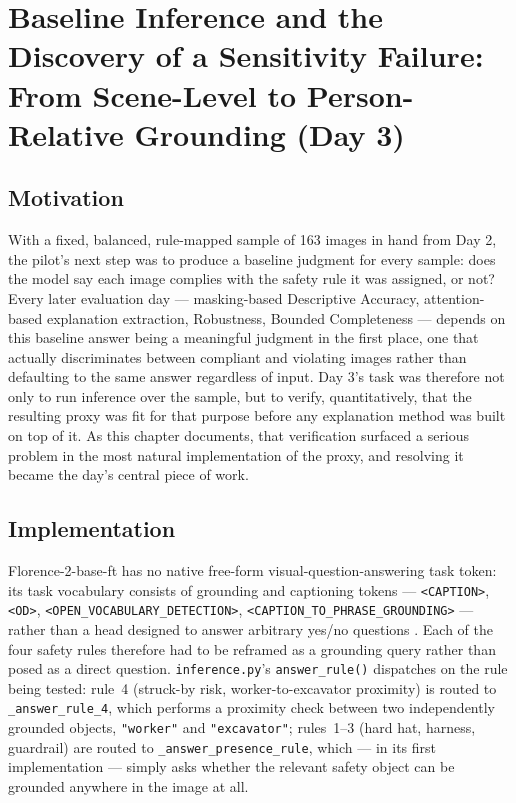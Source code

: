 \chapter{Baseline Inference and the Discovery of a Sensitivity Failure: From Scene-Level to Person-Relative Grounding (Day 3)}
\label{chap:day03}

\section{Motivation}

With a fixed, balanced, rule-mapped sample of 163 images in hand from Day 2, the pilot's next
step was to produce a baseline judgment for every sample: does the model say each image complies
with the safety rule it was assigned, or not? Every later evaluation day --- masking-based
Descriptive Accuracy, attention-based explanation extraction, Robustness, Bounded Completeness ---
depends on this baseline answer being a meaningful judgment in the first place, one that actually
discriminates between compliant and violating images rather than defaulting to the same answer
regardless of input. Day 3's task was therefore not only to run inference over the sample, but to
verify, quantitatively, that the resulting proxy was fit for that purpose before any explanation
method was built on top of it. As this chapter documents, that verification surfaced a serious
problem in the most natural implementation of the proxy, and resolving it became the day's central
piece of work.

\section{Implementation}

Florence-2-base-ft has no native free-form visual-question-answering task token: its task
vocabulary consists of grounding and captioning tokens --- \texttt{<CAPTION>}, \texttt{<OD>},
\texttt{<OPEN\_VOCABULARY\_DETECTION>}, \texttt{<CAPTION\_TO\_PHRASE\_GROUNDING>} --- rather than a
head designed to answer arbitrary yes/no questions \citep{xiao2024florence2}. Each of the four
safety rules therefore had to be reframed as a grounding query rather than posed as a direct
question. \texttt{inference.py}'s \texttt{answer\_rule()} dispatches on the rule being tested:
rule~4 (struck-by risk, worker-to-excavator proximity) is routed to \texttt{\_answer\_rule\_4},
which performs a proximity check between two independently grounded objects, \texttt{"worker"} and
\texttt{"excavator"}; rules~1--3 (hard hat, harness, guardrail) are routed to
\texttt{\_answer\_presence\_rule}, which --- in its first implementation --- simply asks whether the
relevant safety object can be grounded anywhere in the image at all.

